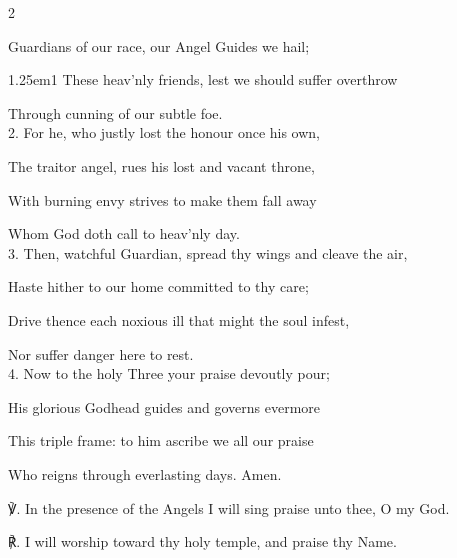 \begin{paracol}{2}
\sloppy

\firstEvensong
{}

\firstEvensongHymn
{} Guardians of our race, our Angel Guides we hail;


\begin{hangparas}{1.25em}{1}
These heav'nly friends, lest we should suffer overthrow

Through cunning of our subtle foe.\\

2. For he, who justly lost the honour once his own,

The traitor angel, rues his lost and vacant throne,

With burning envy strives to make them fall away

Whom God doth call to heav'nly day.\\

3. Then, watchful Guardian, spread thy wings and cleave the air,

Haste hither to our home committed to thy care;

Drive thence each noxious ill that might the soul infest,

Nor suffer danger here to rest.\\

4. Now to the holy Three your praise devoutly pour;

His glorious Godhead guides and governs evermore

This triple frame: to him ascribe we all our praise

Who reigns through everlasting days. Amen.\\
\end{hangparas}

℣. In the presence of the Angels I will sing praise unto thee, O my God.

℟. I will worship toward thy holy temple, and praise thy Name.


\switchcolumn

\mattins
{}


\end{paracol}
